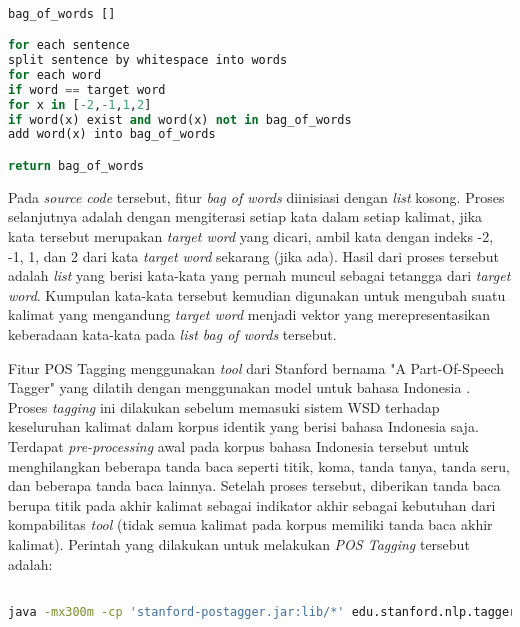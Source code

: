 \begin{lstlisting}[language=python,caption={Fitur Bag of Words}, label={fitur-bag-of-words}]

bag_of_words []

for each sentence
split sentence by whitespace into words
for each word
if word == target word
for x in [-2,-1,1,2]
if word(x) exist and word(x) not in bag_of_words
add word(x) into bag_of_words

return bag_of_words

\end{lstlisting}

Pada \textit{source code} tersebut, fitur \textit{bag of words} diinisiasi dengan \textit{list} kosong. Proses selanjutnya adalah dengan mengiterasi setiap kata dalam setiap kalimat, jika kata tersebut merupakan \textit{target word} yang dicari, ambil kata dengan indeks -2, -1, 1, dan 2 dari kata \textit{target word} sekarang (jika ada). Hasil dari proses tersebut adalah \textit{list} yang berisi kata-kata yang pernah muncul sebagai tetangga dari \textit{target word}. Kumpulan kata-kata tersebut kemudian digunakan untuk mengubah suatu kalimat yang mengandung \textit{target word} menjadi vektor yang merepresentasikan keberadaan kata-kata pada \textit{list bag of words} tersebut.

Fitur POS Tagging menggunakan \textit{tool} dari Stanford bernama "A Part-Of-Speech Tagger" yang dilatih dengan menggunakan model untuk bahasa Indonesia \citep{dinakaramani2014designing}. Proses \textit{tagging} ini dilakukan sebelum memasuki sistem WSD terhadap keseluruhan kalimat dalam korpus identik yang berisi bahasa Indonesia saja. Terdapat \textit{pre-processing} awal pada korpus bahasa Indonesia tersebut untuk menghilangkan beberapa tanda baca seperti titik, koma, tanda tanya, tanda seru, dan beberapa tanda baca lainnya. Setelah proses tersebut, diberikan tanda baca berupa titik pada akhir kalimat sebagai indikator akhir sebagai kebutuhan dari kompabilitas \textit{tool} (tidak semua kalimat pada korpus memiliki tanda baca akhir kalimat). Perintah yang dilakukan untuk melakukan \textit{POS Tagging} tersebut adalah:

\begin{lstlisting}[language=bash,caption={Stanford POS Tagger}, label={stanford-pos-tagger}]

java -mx300m -cp 'stanford-postagger.jar:lib/*' edu.stanford.nlp.tagger.maxent.MaxentTagger -model <model_bahasa_indonesia> -textFile <korpus_bahasa_indonesia>

\end{lstlisting}

